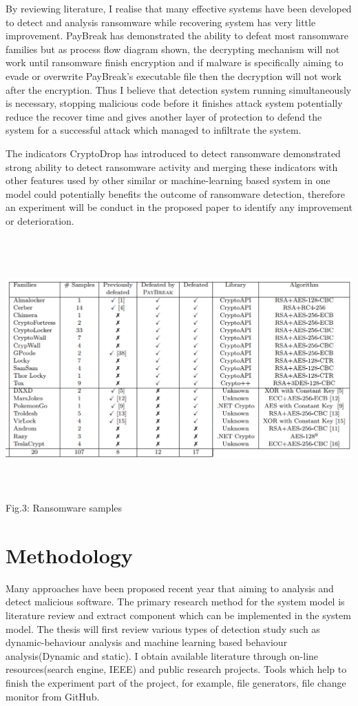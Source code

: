 \documentclass[]{PLR-ShaofengLiu}
\begin{document}
By reviewing literature, I realise that many effective systems have been 
developed to detect and analysis ransomware while recovering system has 
very little improvement. PayBreak has demonstrated the ability to defeat 
most ransomware families but as process flow diagram shown, the decrypting 
mechanism will not work until ransomware finish encryption and if malware 
is specifically aiming to evade or overwrite PayBreak’s executable file 
then the decryption will not work after the encryption. Thus I believe 
that detection system running simultaneously is necessary, stopping 
malicious code before it finishes attack system potentially reduce 
the recover time and gives another layer of protection to defend the system for 
a successful attack which managed to infiltrate the system.

The indicators CryptoDrop\cite{CryptoDrop} has introduced to detect ransomware 
demonstrated strong ability to detect ransomware activity and merging these indicators with
other features used by other similar\cite{UN, UN2} or machine-learning based system\cite{RHUL:2015,Lorenzo:RHUL}
in one model could potentially benefits the outcome of ransomware detection, therefore an experiment
will be conduct in the proposed paper to identify any improvement or deterioration.







\includegraphics[width=16cm , height=10cm]{paybreak_r.png}
Fig.3: Ransomware samples

\section{Methodology}
Many approaches have been proposed recent year that aiming to analysis and detect malicious software. The primary research method for the system model is literature review and extract component which can be implemented in the system model. The thesis will first review various types of detection study such as dynamic-behaviour analysis and machine learning based behaviour analysis(Dynamic and static). I obtain available literature through on-line resources(search engine, IEEE) and public research projects. Tools which help to finish the experiment part of the project, for example, file generators, file change monitor from GitHub.
\end{document}
